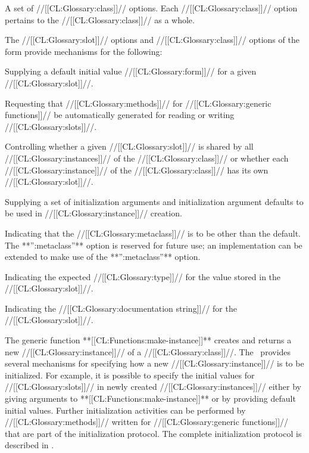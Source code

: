 \itemitem{\bull} A set of //[[CL:Glossary:class]]// options.  
  Each //[[CL:Glossary:class]]// option pertains to the //[[CL:Glossary:class]]// as a whole.  

\endlist
                                               The //[[CL:Glossary:slot]]// options and //[[CL:Glossary:class]]// options of  the  form provide mechanisms for the following:

\beginlist

\itemitem{\bull} Supplying a default initial value //[[CL:Glossary:form]]//  for a given //[[CL:Glossary:slot]]//.  

\itemitem{\bull} Requesting that //[[CL:Glossary:methods]]// for //[[CL:Glossary:generic functions]]// be automatically generated for reading or writing //[[CL:Glossary:slots]]//. 

\itemitem{\bull} Controlling whether a given //[[CL:Glossary:slot]]// is shared by  all //[[CL:Glossary:instances]]// of the //[[CL:Glossary:class]]// or whether each  //[[CL:Glossary:instance]]// of the //[[CL:Glossary:class]]// has its own //[[CL:Glossary:slot]]//.

\itemitem{\bull} Supplying a set of initialization arguments and initialization argument defaults to be used in //[[CL:Glossary:instance]]// creation.

\itemitem{\bull} Indicating that the //[[CL:Glossary:metaclass]]// is to be other  than the default.  The **'':metaclass''** option is reserved for future use;  an implementation can be extended to make use of the **'':metaclass''** option.

\itemitem{\bull} Indicating the expected //[[CL:Glossary:type]]// for the value stored in the //[[CL:Glossary:slot]]//.

\itemitem{\bull} Indicating the //[[CL:Glossary:documentation string]]// for the //[[CL:Glossary:slot]]//.

\endlist 

\endsubSection%

\goodbreak

                       The generic function **[[CL:Functions:make-instance]]** creates and returns a new //[[CL:Glossary:instance]]// of a //[[CL:Glossary:class]]//.   The \OS\ provides several mechanisms for specifying how a new //[[CL:Glossary:instance]]// is to be initialized.  For example, it is possible to specify the initial values for //[[CL:Glossary:slots]]// in newly created //[[CL:Glossary:instances]]//  either by giving arguments to **[[CL:Functions:make-instance]]** or by providing default initial values.  Further initialization activities can be performed by //[[CL:Glossary:methods]]// written for //[[CL:Glossary:generic functions]]//  that are part of the initialization protocol.  The complete initialization protocol is described in \secref\ObjectCreationAndInit.

